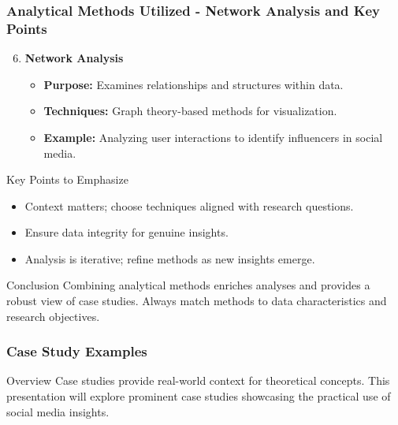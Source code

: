 \documentclass{beamer}
\begin{document}
\begin{frame}[fragile]
    \frametitle{Analytical Methods Utilized - Network Analysis and Key Points}
    \begin{enumerate}
        \setcounter{enumi}{5}
        \item \textbf{Network Analysis}
        \begin{itemize}
            \item \textbf{Purpose:} Examines relationships and structures within data.
            \item \textbf{Techniques:} Graph theory-based methods for visualization.
            \item \textbf{Example:} Analyzing user interactions to identify influencers in social media.
        \end{itemize}
    \end{enumerate}

    \begin{block}{Key Points to Emphasize}
        \begin{itemize}
            \item Context matters; choose techniques aligned with research questions.
            \item Ensure data integrity for genuine insights.
            \item Analysis is iterative; refine methods as new insights emerge.
        \end{itemize}
    \end{block}

    \begin{block}{Conclusion}
        Combining analytical methods enriches analyses and provides a robust view of case studies.
        Always match methods to data characteristics and research objectives.
    \end{block}
\end{frame}

\begin{frame}[fragile]
    \frametitle{Case Study Examples}
    \begin{block}{Overview}
        Case studies provide real-world context for theoretical concepts. 
        This presentation will explore prominent case studies showcasing the practical use of social media insights.
    \end{block}
\end{frame}
\end{document}
